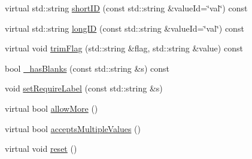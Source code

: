 \begin{DoxyCompactItemize}
\item 
virtual std\+::string \hyperlink{classTCLAP_1_1Arg_aef8efaf3811162b2b2b2a84c6db280fa}{short\+ID} (const std\+::string \&value\+Id=\char`\"{}val\char`\"{}) const 
\item 
virtual std\+::string \hyperlink{classTCLAP_1_1Arg_aad93aff46e1fc67e3853765f565bfa96}{long\+ID} (const std\+::string \&value\+Id=\char`\"{}val\char`\"{}) const 
\item 
virtual void \hyperlink{classTCLAP_1_1Arg_a54595328e81f5fb77859563690faab25}{trim\+Flag} (std\+::string \&flag, std\+::string \&value) const 
\item 
bool \hyperlink{classTCLAP_1_1Arg_a2eb0ffefe163218bdc8b4b7a33a974a7}{\+\_\+has\+Blanks} (const std\+::string \&s) const 
\item 
void \hyperlink{classTCLAP_1_1Arg_aae5c959f31af1a484a8af06f84a6e8b0}{set\+Require\+Label} (const std\+::string \&s)
\item 
virtual bool \hyperlink{classTCLAP_1_1Arg_a9aef735d37ef95ca1b7dc7a07850b984}{allow\+More} ()
\item 
virtual bool \hyperlink{classTCLAP_1_1Arg_ad356870538a255d639e26b30330202ae}{accepts\+Multiple\+Values} ()
\item 
virtual void \hyperlink{classTCLAP_1_1Arg_ab5b5dc9a9b0381561f0684523f943a2c}{reset} ()
\end{DoxyCompactItemize}
